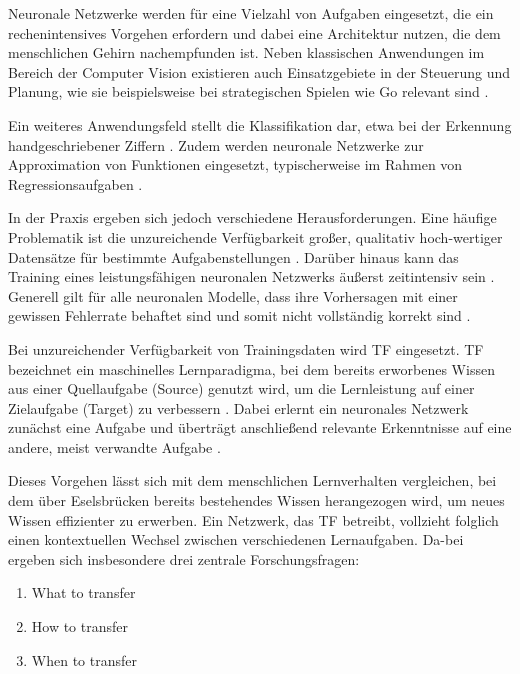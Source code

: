 \newline
Neuronale Netzwerke werden für eine Vielzahl von Aufgaben eingesetzt, die ein rechenintensives Vorgehen erfordern und dabei eine Architektur 
nutzen, die dem menschlichen Gehirn nachempfunden ist. Neben klassischen Anwendungen im Bereich der Computer Vision existieren auch 
Einsatzgebiete in der Steuerung und Planung, wie sie beispielsweise bei strategischen Spielen wie Go relevant sind 
\cite{deep_neural_networks_scientific_models}.

Ein weiteres Anwendungsfeld stellt die Klassifikation dar, etwa bei der Erkennung handgeschriebener Ziffern \cite{handwritten_digit}. 
Zudem werden neuronale Netzwerke zur Approximation von Funktionen eingesetzt, typischerweise im Rahmen von Regressionsaufgaben \cite{Gen_Reg}.

In der Praxis ergeben sich jedoch verschiedene Herausforderungen. Eine häufige Problematik ist die unzureichende Verfügbarkeit großer, 
qualitativ hoch-wertiger Datensätze für bestimmte Aufgabenstellungen \cite{survey_transfer}. Darüber hinaus kann das Training eines 
leistungsfähigen neuronalen Netzwerks äußerst zeitintensiv sein \cite{cascor}. Generell gilt für alle neuronalen Modelle, dass ihre 
Vorhersagen mit einer gewissen Fehlerrate behaftet sind und somit nicht vollständig korrekt sind \cite{EvoClassAndReg}.

Bei unzureichender Verfügbarkeit von Trainingsdaten wird TF eingesetzt. 
TF bezeichnet ein maschinelles Lernparadigma, bei dem bereits erworbenes Wissen aus einer Quellaufgabe (Source) genutzt 
wird, um die Lernleistung auf einer Zielaufgabe (Target) zu verbessern \cite{transfer_learning}. Dabei erlernt ein neuronales Netzwerk 
zunächst eine Aufgabe und überträgt anschließend relevante Erkenntnisse auf eine andere, meist verwandte Aufgabe \cite{phd_deep_cascade}.

Dieses Vorgehen lässt sich mit dem menschlichen Lernverhalten vergleichen, bei dem über Eselsbrücken bereits bestehendes Wissen herangezogen 
wird, um neues Wissen effizienter zu erwerben. Ein Netzwerk, das TF betreibt, vollzieht folglich einen kontextuellen Wechsel 
zwischen verschiedenen Lernaufgaben. Da-bei ergeben sich insbesondere drei zentrale Forschungsfragen:

\begin{enumerate}
    \item What to transfer
    \item How to transfer
    \item When to transfer
\end{enumerate}
\cite{survey_transfer}

